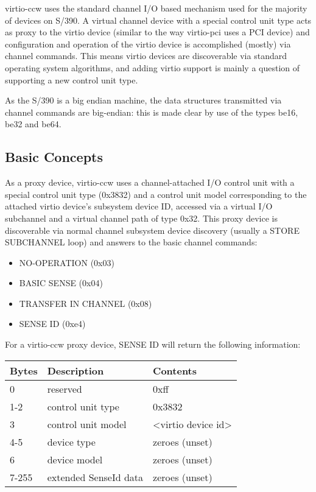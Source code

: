 virtio-ccw uses the standard channel I/O based mechanism used for
the majority of devices on S/390. A virtual channel device with a
special control unit type acts as proxy to the virtio device
(similar to the way virtio-pci uses a PCI device) and
configuration and operation of the virtio device is accomplished
(mostly) via channel commands. This means virtio devices are
discoverable via standard operating system algorithms, and adding
virtio support is mainly a question of supporting a new control
unit type.

As the S/390 is a big endian machine, the data structures transmitted
via channel commands are big-endian: this is made clear by use of
the types be16, be32 and be64.

\subsection{Basic Concepts}\label{sec:Virtio Transport Options / Virtio over channel I/O / Basic Concepts}

As a proxy device, virtio-ccw uses a channel-attached I/O control
unit with a special control unit type (0x3832) and a control unit
model corresponding to the attached virtio device's subsystem
device ID, accessed via a virtual I/O subchannel and a virtual
channel path of type 0x32. This proxy device is discoverable via
normal channel subsystem device discovery (usually a STORE
SUBCHANNEL loop) and answers to the basic channel commands:

\begin{itemize}
\item NO-OPERATION (0x03)
\item BASIC SENSE (0x04)
\item TRANSFER IN CHANNEL (0x08)
\item SENSE ID (0xe4)
\end{itemize}

For a virtio-ccw proxy device, SENSE ID will return the following
information:

\begin{tabular}{ |l|l|l| }
\hline
Bytes & Description & Contents \\
\hline \hline
0     & reserved              & 0xff \\
\hline
1-2   & control unit type     & 0x3832 \\
\hline
3     & control unit model    & <virtio device id> \\
\hline
4-5   & device type           & zeroes (unset) \\
\hline
6     & device model          & zeroes (unset) \\
\hline
7-255 & extended SenseId data & zeroes (unset) \\
\hline
\end{tabular}

